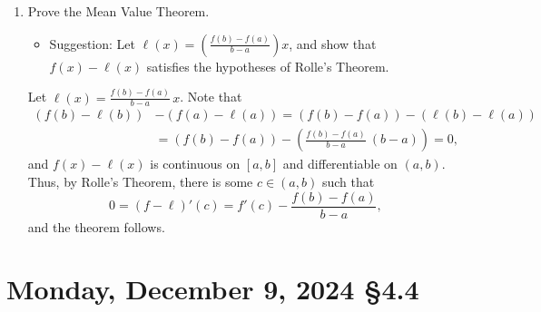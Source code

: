 \documentclass[12pt]{amsart}
\def\ds{\displaystyle}
\def\Mo{Monday}
\numberwithin{equation}{section}
\theoremstyle{plain} %
\newcommand{\Dec}[3]{\section{#2, December #1, 2024 \quad \S#3}}
\theoremstyle{definition}
\theoremstyle{remark}
\begin{document}
\begin{enumerate}
\item Prove the Mean Value Theorem.
\begin{itemize}
\item Suggestion: Let $\ds \ell(x) = \left(\frac{f(b) - f(a)}{b-a}\right) x$, and show that $f(x) - \ell(x)$ satisfies the hypotheses of Rolle's Theorem.
\end{itemize}

\begin{framed}
Let $\ell(x) = \frac{f(b) - f(a)}{b-a}\, x$. Note that \[\begin{aligned} (f(b) -\ell(b))& - (f(a) - \ell(a)) = (f(b) - f(a)) - (\ell(b) - \ell(a)) \\&= (f(b)-f(a)) - (\frac{f(b)-f(a)}{b-a} \ (b-a)) = 0,\end{aligned}\]
and $f(x) - \ell(x)$ is continuous on $[a,b]$ and differentiable on $(a,b)$. Thus, by Rolle's Theorem, there is some $c\in (a,b)$ such that \[0=(f-\ell)'(c)=f'(c) - \frac{f(b)-f(a)}{b-a},\]
and the theorem follows.
\end{framed}
\end{enumerate}
\newpage

\Dec{9}{\Mo}{4.4}
\end{document}
